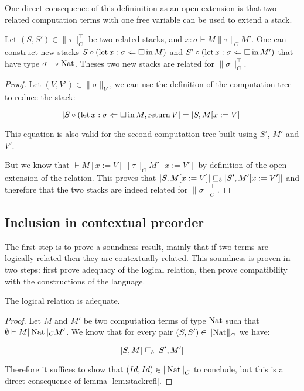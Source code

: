 One direct consequence of this defininition as an open extension is 
that two related computation terms with one free variable can be used 
to extend a stack.

\begin{alemma}
    \label{lem:stackexten}
    Let $(S,S') \in \| \tau \|_C^\top$ be two related stacks,
    and $x: \sigma \vdash M \| \tau \|_C M'$. One can construct 
    new stacks $S \circ (\operatorname{let} x:\sigma \Leftarrow \square \operatorname{in} M)$
    and $S' \circ (\operatorname{let} x:\sigma \Leftarrow \square \operatorname{in} M')$ that 
    have type $\sigma \multimap \textnormal{Nat}$. Theses two new 
    stacks are related for $\| \sigma \|_C^\top$.
\end{alemma}

\begin{proof}
    Let $(V,V') \in \| \sigma \|_V$, we can use the definition 
    of the computation tree to reduce the stack:

    \begin{equation*}
        | S \circ (\operatorname{let} x:\sigma \Leftarrow \square \operatorname{in} M, \operatorname{return} V| 
            = 
        | S, M[x := V]|
    \end{equation*}

    This equation is also valid for the second computation 
    tree built using $S'$, $M'$ and $V'$.

    But we know that $\vdash M[x := V] \| \tau \|_C M'[x := V']$
    by definition of the open extension of the relation. This proves 
    that $|S, M[x:= V]| \sqsubseteq_b |S', M'[x:= V']|$ and therefore 
    that the two stacks are indeed related for $\| \sigma \|_C^\top$.
\end{proof}

\subsection{Inclusion in contextual preorder}

The first step is to prove a soundness result, mainly that 
if two terms are logically related then they are contextually 
related. This soundness is proven in two steps: first prove 
adequacy of the logical relation, then prove compatibility 
with the constructions of the language.

\begin{alemma}[Adequacy]
    The logical relation is adequate.
\end{alemma}

\begin{ensps}
\begin{proof}
    Let $M$ and $M'$ be two computation terms of type $\textnormal{Nat}$
    such that $\emptyset \vdash M \| \textnormal{Nat} \|_C M'$. 
    We know that for every pair $(S,S') \in \| \textnormal{Nat} \|_C^\top$
    we have:

    \begin{equation*}
        | S, M | \sqsubseteq_b |S',M'|
    \end{equation*}

    Therefore it suffices to show that $(Id,Id) \in \| \textnormal{Nat} \|_C^\top$ 
    to conclude, but this is a direct consequence of lemma \ref{lem:stackrefl}.
\end{proof}
\end{ensps}

